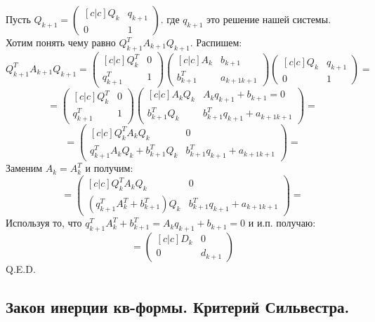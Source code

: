 Пусть $Q_{k+1} = \begin{pmatrix}[c|c] 
    Q_k& q_{k+1}\\
    \hline  0 & 1
\end{pmatrix}$. где $q_{k+1}$ это решение нашей системы. Хотим понять чему равно
$Q_{k+1}^T A_{k+1}Q_{k+1}$. Распишем:
$$Q_{k+1}^T A_{k+1}Q_{k+1} =\begin{pmatrix}[c|c] 
    Q_k^T& 0\\
    \hline  q_{k+1}^T & 1
\end{pmatrix} \begin{pmatrix}[c|c] 
    A_k& b_{k+1}\\
    \hline  b_{k+1}^T & a_{k+1 k+1}
\end{pmatrix} \begin{pmatrix}[c|c] 
    Q_k& q_{k+1}\\
    \hline  0 & 1
\end{pmatrix}  =$$ $$=\begin{pmatrix}[c|c] 
    Q_k^T& 0\\
    \hline  q_{k+1}^T & 1
\end{pmatrix}  \begin{pmatrix}[c|c] 
    A_k Q_k& A_k q_{k+1} + b_{k+1} = 0\\
    \hline  b_{k+1}^T Q_k & b_{k+1}^Tq_{k+1} + a_{k+1 k+1}
\end{pmatrix} =$$
$$= \begin{pmatrix}[c|c] 
    Q_k^TA_k Q_k& 0\\
    \hline  q_{k+1}^TA_kQ_k + b_{k+1}^T Q_k& b_{k+1}^Tq_{k+1} + a_{k+1 k+1}
\end{pmatrix} =$$
Заменим $A_k = A_k^T$ и получим:
$$=\begin{pmatrix}[c|c] 
    Q_k^TA_k Q_k& 0\\
    \hline  (q_{k+1}^TA^T_k + b_{k+1}^T) Q_k& b_{k+1}^Tq_{k+1} + a_{k+1 k+1}
\end{pmatrix} = $$
Используя то, что $q_{k+1}^TA^T_k + b_{k+1}^T = A_kq_{k+1} + b_{k+1} = 0$ и и.п. получаю:
$$=\begin{pmatrix}[c|c] 
     D_k& 0\\
    \hline  0 & d_{k+1}
\end{pmatrix} $$
\hfill Q.E.D.
\newpage 

\subsection{Закон инерции кв-формы. Критерий Сильвестра.}


